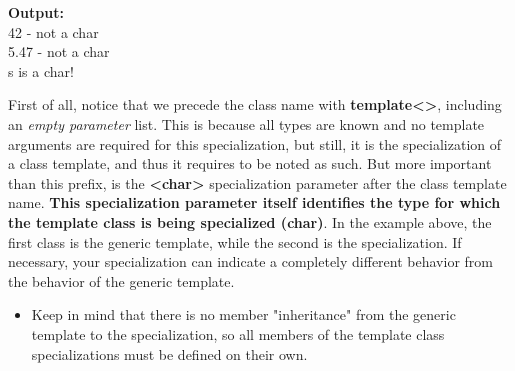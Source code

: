 \documentclass[12pt , a4paper]{article}
\begin{document}
	\begin{tcolorbox}
	\textbf{Output:}\\
	42 -  not a char\\
	5.47 -  not a char\\
	s is a char!
	\end{tcolorbox}
	First of all, notice that we precede the class name with \textbf{template<>}, including an \emph{empty parameter} list. This is because all types are known and no template arguments are required for this specialization, but still, it is the specialization of a class template, and thus it requires to be noted as such. But more important than this prefix, is the \textbf{<char>} specialization parameter after the class template name. \textbf{This specialization parameter itself identifies the type for which the template class is being specialized (char)}. In the example above, the first class is the generic template, while the second is the specialization. If necessary, your specialization can indicate a completely different behavior from the behavior of the generic template.\\

	\begin{importantBox}

		\begin{itemize}
			\item Keep in mind that there is no member "inheritance" from the generic template to the specialization, so all members of the template class specializations must be defined on their own.
		\end{itemize}
	\end{importantBox}

%
%
\end{document}

